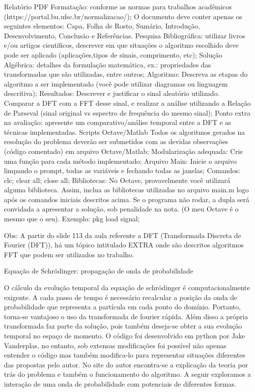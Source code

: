     Relatório PDF
        Formatação: conforme as normas para trabalhos acadêmicos (https://portal.bu.ufsc.br/normalizacao/);
            O documento deve conter apenas os seguintes elementos: Capa, Folha de Rosto, Sumário, Introdução, Desenvolvimento, Conclusão e Referências.
        Pesquisa Bibliográfica: utilizar livros e/ou artigos científicos, descrever em que situações o algoritmo escolhido deve pode ser aplicado (aplicações,tipos de sinais, comprimento, etc);
        Solução Algébrica: detalhes da formulação matemática, ex.: propriedades das transformadas que são utilizadas, entre outros;
        Algoritmo: Descreva as etapas do algoritmo a ser implementado (você pode utilizar diagramas ou linguagem descritiva);
        Resultados: Descrever e justificar o sinal aleatório utilizado. Comparar a DFT com a FFT desse sinal, e realizar a análise utilizando a Relação de Parseval (sinal original vs espectro de frequência do mesmo sinal);
        Ponto extra na avaliação: apresente um comparativo/análise temporal entre a DFT e as técnicas implementadas.
    Scripts Octave/Matlab 
        Todos os algoritmos gerados na resolução do problema deverão ser submetidos com as devidas observações (código comentado) em arquivo Octave/Matlab;
        Modularização adequada: Crie uma função para cada método implementado;
        Arquivo Main: Inicie o arquivo limpando o prompt, todas as variáveis e fechando todas as janelas;
            Comandos: clc; clear all; close all;
        Bibliotecas: No Octave, provavelmente você utilizará alguma biblioteca. Assim, inclua as bibliotecas utilizadas no arquivo 
        main.m 
        logo após os comandos iniciais descritos acima. Se o programa não rodar, a dupla será convidada a apresentar a solução, sob penalidade na nota. (O meu Octave é o mesmo que o seu). Exemplo:
            pkg load signal;

Obs: A partir do slide 113 da aula referente a DFT (Transformada Discreta de Fourier (DFT)), há um tópico intitulado EXTRA onde são descritos algoritmos FFT que podem ser utilizados no trabalho.


Equação de Schrödinger: propagação de onda de probabilidade

O cálculo da evolução temporal da equação de schrödinger é computacionalmente exigente. A cada passo de tempo é necessário recalcular a posição da onda de probabilidade que representa a partícula em cada ponto do domínio. Portanto, torna-se vantajoso o uso da transformada de fourier rápida. Além disso a própria transformada faz parte da solução, pois também deseja-se obter a sua evolução temporal no espaço de momento. O código foi desenvolvido em python por Jake Vanderplas, no entanto, sob extensas modificações foi possível não apenas entender o código mas também modifica-lo para representar situações diferentes das propostas pelo autor. No site do autor encontra-se a explicação da teoria por trás do problema e também o funcionamento do algoritmo. A seguir exploramos a interação de uma onda de probabilidade com potenciais de diferentes formas.


